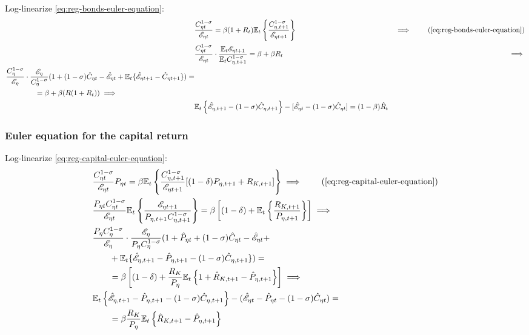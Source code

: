 \documentclass[
thesis.tex
]{subfiles}
\begin{document}
Log-linearize \ref{eq:reg-bonds-euler-equation}:
\begin{alignat}{2}
	& \frac{ C_{\eta t}^{1-\sigma}}{ \te} = \beta (1 + R_{t}) \E \left\{ \frac{ C_{\eta, t+1}^{1-\sigma}}{ \te[t+1]} \right\} &\implies \tag{\ref{eq:reg-bonds-euler-equation}}\\
	& \frac{ C_{\eta t}^{1-\sigma}}{\te} \cdot \frac{\E \te[t+1]}{\E C_{\eta, t+1}^{1-\sigma}} = \beta + \beta R_{t} &\implies \nonumber \\
	\begin{split}
		& \frac{C_{\eta}^{1-\sigma}}{\te[]} \cdot \frac{\te[]}{C_{\eta}^{1-\sigma}} (1 + (1-\sigma) \hat{C}_{\eta t} - \hat{\mathscr{E}}_{\eta t} + \E \{ \hat{\mathscr{E}}_{\eta t+1} - \hat{C}_{\eta t+1} \}) = \\ & \qquad \qquad = \beta + \beta (R(1 + R_{t})) \implies
	\end{split} \nonumber \\
	& \E \left\{ \hat{\mathscr{E}}_{\eta, t+1} - (1 -\sigma)\hat{C}_{\eta, t+1} \right\} - [\hat{\mathscr{E}}_{\eta t} - (1 -\sigma)\hat{C}_{\eta t}] = (1 -\beta) \hat{R}_{t} \label{eq:reg-ll-bonds-euler-equation}
\end{alignat}


\subsubsection*{Euler equation for the capital return}

Log-linearize \ref{eq:reg-capital-euler-equation}:
	\begin{alignat}{2}
		& \frac{ C_{\eta t}^{1-\sigma}}{ \te} P_{\eta t} = \beta \mathbb{E}_t \left\{ \frac{ C_{\eta, t+1}^{1-\sigma}}{ \te[t+1]} [(1-\delta) P_{\eta, t+1} + R_{K,t+1}] \right\} \implies \tag{\ref{eq:reg-capital-euler-equation}} \\
		& \frac{P_{\eta t} C_{\eta t}^{1-\sigma}}{\te} \mathbb{E}_t \left\{ \frac{\te[t+1]}{P_{\eta, t+1} C_{\eta, t+1}^{1-\sigma}} \right\} = \beta \left[ (1-\delta) + \mathbb{E}_t \left\{ \frac{R_{K,t+1}}{P_{\eta, t+1}} \right\} \right] \implies \nonumber \\
		& \frac{P_{\eta} C_{\eta}^{1-\sigma}}{\te[]} \cdot \frac{\te[]}{P_{\eta} C_{\eta}^{1-\sigma}} (1 + \hat{P}_{\eta t} + (1 -\sigma) \hat{C}_{\eta t} - \hat{\mathscr{E}}_{\eta t} + \nonumber \\ 
		& \qquad + \E \{\hat{\mathscr{E}}_{\eta, t+1} - \hat{P}_{\eta, t+1} - (1 -\sigma) \hat{C}_{\eta, t+1}\}) = \nonumber \\
		& \qquad = \beta \left[ (1-\delta) + \frac{R_{K}}{P_{\eta}} \mathbb{E}_t \left\{ 1 + \hat{R}_{K, t+1} -\hat{P}_{\eta, t+1} \right\} \right] \implies \nonumber \\
		& \E \left\{ \hat{\mathscr{E}}_{\eta, t+1} - \hat{P}_{\eta, t+1}  - (1 -\sigma) \hat{C}_{\eta, t+1} \right\} - (\hat{\mathscr{E}}_{\eta t} - \hat{P}_{\eta t} - (1 -\sigma) \hat{C}_{\eta t}) = \nonumber \\
		& \qquad = \beta \frac{R_{K}}{P_{\eta}} \mathbb{E}_t \left\{ \hat{R}_{K, t+1} - \hat{P}_{\eta, t+1} \right\} \label{eq:reg-ll-capital-euler-equation}
	\end{alignat}
	
\end{document}

